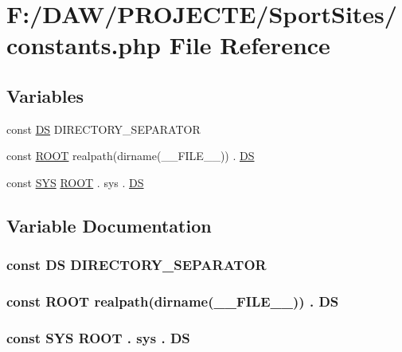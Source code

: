 \hypertarget{constants_8php}{}\section{F\+:/\+D\+A\+W/\+P\+R\+O\+J\+E\+C\+T\+E/\+Sport\+Sites/constants.php File Reference}
\label{constants_8php}
\subsection*{Variables}
\begin{DoxyCompactItemize}
\item 
const \hyperlink{constants_8php_ae073998f73900b8375397889044c8313}{D\+S} D\+I\+R\+E\+C\+T\+O\+R\+Y\+\_\+\+S\+E\+P\+A\+R\+A\+T\+O\+R
\item 
const \hyperlink{constants_8php_a18c0644836e196aed6d63779e14d6bd8}{R\+O\+O\+T} realpath(dirname(\+\_\+\+\_\+\+F\+I\+L\+E\+\_\+\+\_\+)) . \hyperlink{constants_8php_ae073998f73900b8375397889044c8313}{D\+S}
\item 
const \hyperlink{constants_8php_ad07838f8369ce60156ada55d80c2822b}{S\+Y\+S} \hyperlink{constants_8php_a18c0644836e196aed6d63779e14d6bd8}{R\+O\+O\+T} . \textquotesingle{}sys\textquotesingle{} . \hyperlink{constants_8php_ae073998f73900b8375397889044c8313}{D\+S}
\end{DoxyCompactItemize}


\subsection{Variable Documentation}
\hypertarget{constants_8php_ae073998f73900b8375397889044c8313}{}
\subsubsection[{D\+S}]{\setlength{\rightskip}{0pt plus 5cm}const D\+S D\+I\+R\+E\+C\+T\+O\+R\+Y\+\_\+\+S\+E\+P\+A\+R\+A\+T\+O\+R}\label{constants_8php_ae073998f73900b8375397889044c8313}
\hypertarget{constants_8php_a18c0644836e196aed6d63779e14d6bd8}{}
\subsubsection[{R\+O\+O\+T}]{\setlength{\rightskip}{0pt plus 5cm}const R\+O\+O\+T realpath(dirname(\+\_\+\+\_\+\+F\+I\+L\+E\+\_\+\+\_\+)) . {\bf D\+S}}\label{constants_8php_a18c0644836e196aed6d63779e14d6bd8}
\hypertarget{constants_8php_ad07838f8369ce60156ada55d80c2822b}{}
\subsubsection[{S\+Y\+S}]{\setlength{\rightskip}{0pt plus 5cm}const S\+Y\+S {\bf R\+O\+O\+T} . \textquotesingle{}sys\textquotesingle{} . {\bf D\+S}}\label{constants_8php_ad07838f8369ce60156ada55d80c2822b}
